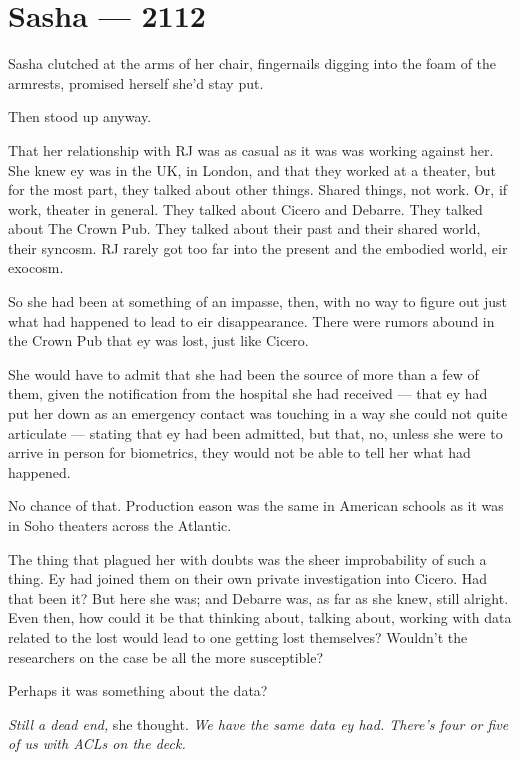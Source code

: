 \hypertarget{sasha-2112}{%
\chapter*{Sasha — 2112}\label{sasha-2112}}

Sasha clutched at the arms of her chair, fingernails digging into the foam of the armrests, promised herself she'd stay put.

Then stood up anyway.

That her relationship with RJ was as casual as it was was working against her. She knew ey was in the UK, in London, and that they worked at a theater, but for the most part, they talked about other things. Shared things, not work. Or, if work, theater in general. They talked about Cicero and Debarre. They talked about The Crown Pub. They talked about their past and their shared world, their syncosm. RJ rarely got too far into the present and the embodied world, eir exocosm.

So she had been at something of an impasse, then, with no way to figure out just what had happened to lead to eir disappearance. There were rumors abound in the Crown Pub that ey was lost, just like Cicero.

She would have to admit that she had been the source of more than a few of them, given the notification from the hospital she had received — that ey had put her down as an emergency contact was touching in a way she could not quite articulate — stating that ey had been admitted, but that, no, unless she were to arrive in person for biometrics, they would not be able to tell her what had happened.

No chance of that. Production eason was the same in American schools as it was in Soho theaters across the Atlantic.

The thing that plagued her with doubts was the sheer improbability of such a thing. Ey had joined them on their own private investigation into Cicero. Had that been it? But here she was; and Debarre was, as far as she knew, still alright. Even then, how could it be that thinking about, talking about, working with data related to the lost would lead to one getting lost themselves? Wouldn't the researchers on the case be all the more susceptible?

Perhaps it was something about the data?

\emph{Still a dead end,} she thought. \emph{We have the same data ey had. There's four or five of us with ACLs on the deck.}


